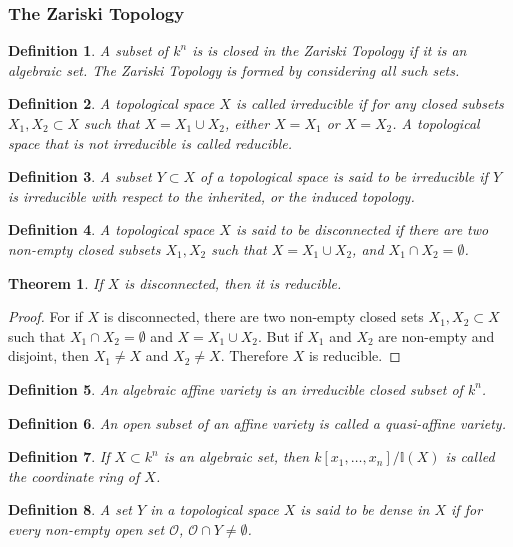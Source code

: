 \documentclass{article}
\theoremstyle{mystyle}
\newtheorem{theorem}{Theorem}[section]
\newtheorem{definition}{Definition}[section]
\begin{document}
\subsubsection{The Zariski Topology}
\begin{definition}
A subset of $k^n$ is is closed in the Zariski Topology if it is an algebraic set. The Zariski Topology is formed by considering all such sets.
\end{definition}
\begin{definition}
A topological space $X$ is called irreducible if for any closed subsets $X_1,X_2\subset X$ such that $X=X_1\cup X_2$, either $X=X_1$ or $X=X_2$. A topological space that is not irreducible is called reducible.
\end{definition}
\begin{definition}
A subset $Y\subset X$ of a topological space is said to be irreducible if $Y$ is irreducible with respect to the inherited, or the induced topology.
\end{definition}
\begin{definition}
A topological space $X$ is said to be disconnected if there are two non-empty closed subsets $X_1,X_2$ such that $X = X_1\cup X_2$, and $X_1\cap X_2 = \emptyset$.
\end{definition}
\begin{theorem}
If $X$ is disconnected, then it is reducible.
\end{theorem}
\begin{proof}
For if $X$ is disconnected, there are two non-empty closed sets $X_1,X_2\subset X$ such that $X_1\cap X_2 = \emptyset$ and $X = X_1\cup X_2$. But if $X_1$ and $X_2$ are non-empty and disjoint, then $X_1\ne X$ and $X_2 \ne X$. Therefore $X$ is reducible.
\end{proof}
\begin{definition}
An algebraic affine variety is an irreducible closed subset of $k^n$.
\end{definition}
\begin{definition}
An open subset of an affine variety is called a quasi-affine variety.
\end{definition}
\begin{definition}
If $X\subset k^n$ is an algebraic set, then $k[x_1,\hdots ,x_n]/\mathbb{I}(X)$ is called the coordinate ring of $X$.
\end{definition}
\begin{definition}
A set $Y$ in a topological space $X$ is said to be dense in $X$ if for every non-empty open set $\mathcal{O}$, $\mathcal{O}\cap Y\ne \emptyset$.
\end{definition}
\end{document}
